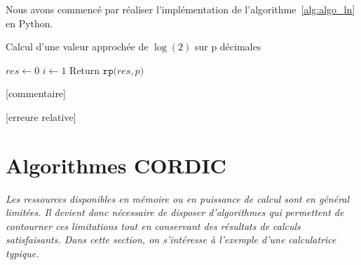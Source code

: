 \documentclass{article}
\begin{document}
Nous avons commencé par réaliser l'implémentation de l'algorithme~\ref{alg:algo_ln} en Python.

\begin{algorithm}
  \caption{Calcul d'une valeur approchée de $\log(2)$ sur p d\'ecimales}
  \label{alg:algo_ln}
  $res \gets 0$\;
  $i \gets 1$\;
  Return $\texttt{rp(}res,p\texttt{)}$\;
\end{algorithm}

[commentaire]

[erreure relative]






 



  




\section{Algorithmes CORDIC}
\label{sec:cordic}

\textit{Les ressources disponibles en m\'emoire ou en puissance de calcul sont en g\'en\'eral limit\'ees. Il devient donc n\'ecessaire de disposer d'algorithmes qui permettent de contourner ces limitations tout en conservant des résultats de calculs satisfaisants. Dans cette section, on s'int\'eresse à l'exemple d'une calculatrice typique.}
\vskip 1mm ~


\end{document}
